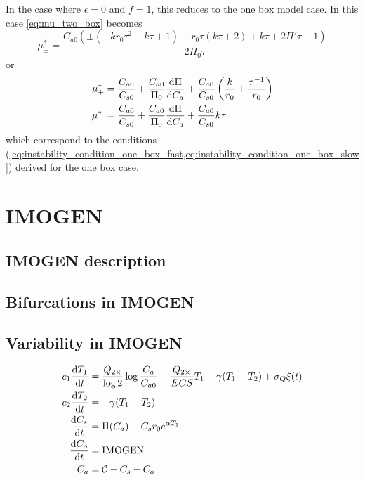 In the case where $\epsilon = 0$ and $f = 1$, this reduces to the one box model case. In this case \cref{eq:mu_two_box} becomes
\begin{equation}
  \label{eq:mu_zero_one}
  \mu^*_{\pm} = \frac{C_{a0} \left(\pm\left(-k r_0 \tau ^2+k \tau +1\right)+r_0 \tau  (k \tau +2)+k \tau +2 \Pi' \tau +1\right)}{2 \Pi_0 \tau}
\end{equation}
or
\begin{align}
  \label{eq:mu_zero_one_cases}
  \mu_+^* &= \frac{C_{a0}}{C_{s0}} + \frac{C_{a0}}{\Pi_0}\dv{\Pi}{C_a} + \frac{C_{a0}}{C_{s0}} \left(\frac{k}{r_0} + \frac{\tau^{-1}}{r_0}\right) \\
  \mu_-^* &= \frac{C_{a0}}{C_{s0}} + \frac{C_{a0}}{\Pi_0}\dv{\Pi}{C_a} + \frac{C_{a0}}{C_{s0}}k\tau 
\end{align}
which correspond to the conditions (\cref{eq:instability_condition_one_box_fast,eq:instability_condition_one_box_slow}) derived for the one box case.


\section{IMOGEN}
\subsection{IMOGEN description}
\subsection{Bifurcations in IMOGEN}
\subsection{Variability in IMOGEN}
\begin{subequations}
  \label{eq:climate_system}
  \begin{align}
    c_1 \dv{T_1}{t} &= \frac{Q_{2\times}}{\log 2} \log \frac{C_a}{C_{a0}} - \frac{Q_{2\times}}{ECS}T_1 -\gamma (T_1 - T_2) + \sigma_Q \xi(t)\\
    c_2 \dv{T_2}{t} &= -\gamma(T_1 - T_2) \\
    \dv{C_s}{t}     &= \Pi(C_a) - C_s r_0 e^{\alpha T_1} \\
    \dv{C_o}{t}     &= \mathrm{IMOGEN} \\
    C_a &= \mathcal{C} - C_s - C_o
  \end{align}
\end{subequations}